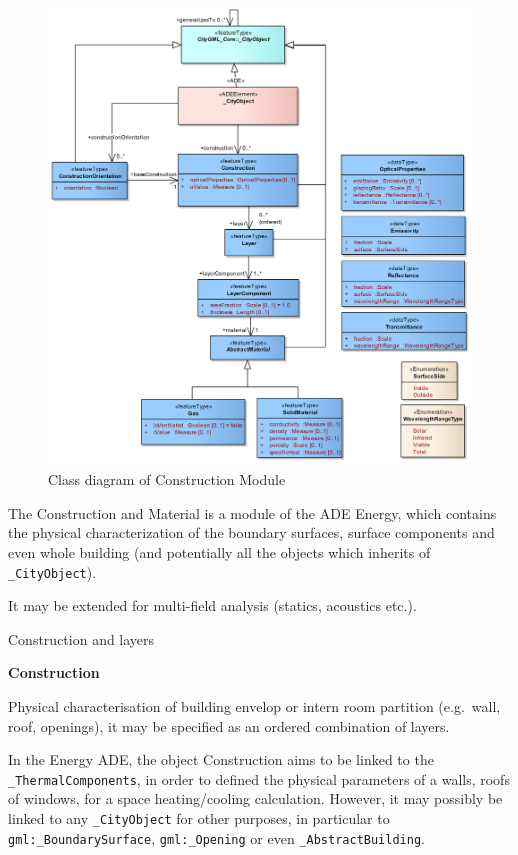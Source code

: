 \documentclass[a4paper,12pt]{article}
\begin{document}
\begin{figure}[htbp]
\centering
\includegraphics{fig/class_construction.png}
\caption{Class diagram of Construction Module}
\end{figure}

The Construction and Material is a module of the ADE Energy, which
contains the physical characterization of the boundary surfaces, surface
components and even whole building (and potentially all the objects
which inherits of \texttt{\_CityObject}).

It may be extended for multi-field analysis (statics, acoustics etc.).

Construction and layers

\textbf{Construction}

Physical characterisation of building envelop or intern room partition
(e.g.~wall, roof, openings), it may be specified as an ordered
combination of layers.

In the Energy ADE, the object Construction aims to be linked to the
\texttt{\_ThermalComponents}, in order to defined the physical
parameters of a walls, roofs of windows, for a space heating/cooling
calculation. However, it may possibly be linked to any
\texttt{\_CityObject} for other purposes, in particular to
\texttt{gml:\_BoundarySurface}, \texttt{gml:\_Opening} or even
\texttt{\_AbstractBuilding}.
\end{document}
